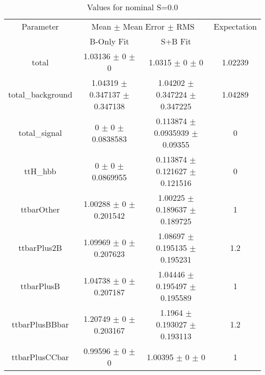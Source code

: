 \begin{table}
\centering
\caption{Values for nominal S=0.0}
\begin{tabular}{cccc}
\toprule
Parameter & \multicolumn{2}{c}{Mean $\pm$ Mean Error $\pm$ RMS} & Expectation\\
 & B-Only Fit & S+B Fit & \\
\midrule
total & \num{1.03136} $\pm$ \num{0} $\pm$ \num{0} & \num{1.0315} $\pm$ \num{0} $\pm$ \num{0} & \num{1.02239}\\
total\_background & \num{1.04319} $\pm$ \num{0.347137} $\pm$ \num{0.347138} & \num{1.04202} $\pm$ \num{0.347224} $\pm$ \num{0.347225} & \num{1.04289}\\
total\_signal & \num{0} $\pm$ \num{0} $\pm$ \num{0.0838583} & \num{0.113874} $\pm$ \num{0.0935939} $\pm$ \num{0.09355} & \num{0}\\
ttH\_hbb & \num{0} $\pm$ \num{0} $\pm$ \num{0.0869955} & \num{0.113874} $\pm$ \num{0.121627} $\pm$ \num{0.121516} & \num{0}\\
ttbarOther & \num{1.00288} $\pm$ \num{0} $\pm$ \num{0.201542} & \num{1.00225} $\pm$ \num{0.189637} $\pm$ \num{0.189725} & \num{1}\\
ttbarPlus2B & \num{1.09969} $\pm$ \num{0} $\pm$ \num{0.207623} & \num{1.08697} $\pm$ \num{0.195135} $\pm$ \num{0.195231} & \num{1.2}\\
ttbarPlusB & \num{1.04738} $\pm$ \num{0} $\pm$ \num{0.207187} & \num{1.04446} $\pm$ \num{0.195497} $\pm$ \num{0.195589} & \num{1}\\
ttbarPlusBBbar & \num{1.20749} $\pm$ \num{0} $\pm$ \num{0.203167} & \num{1.1964} $\pm$ \num{0.193027} $\pm$ \num{0.193113} & \num{1.2}\\
ttbarPlusCCbar & \num{0.99596} $\pm$ \num{0} $\pm$ \num{0} & \num{1.00395} $\pm$ \num{0} $\pm$ \num{0} & \num{1}\\
\bottomrule
\end{tabular}
\end{table}
